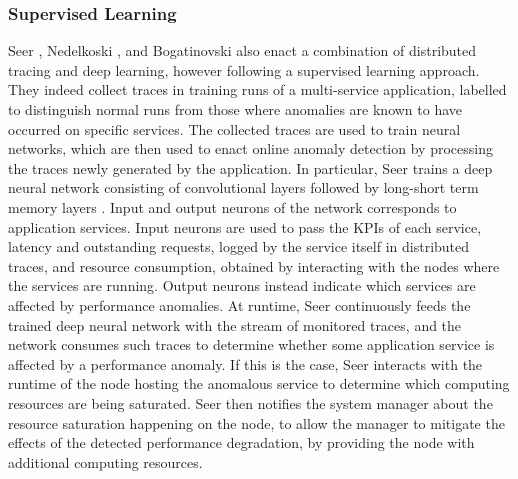 \subsubsection{Supervised Learning}
Seer \cite{17_Gan2019_Seer}, Nedelkoski \etal \cite{34_Nedelkoski2019_AnomalyDetectionDistributedTracing}, and Bogatinovski \etal \cite{36_Bogatinovski2020_SelfSupervisedAnomalyDetection} also enact a combination of distributed tracing and deep learning, however following a supervised learning approach.
They indeed collect traces in training runs of a multi-service application, labelled to distinguish normal runs from those where anomalies are known to have occurred on specific services.
The collected traces are used to train neural networks, which are then used to enact online anomaly detection by processing the traces newly generated by the application.
In particular, Seer \cite{17_Gan2019_Seer} trains a deep neural network consisting of convolutional layers followed by long-short term memory layers \cite{Goodfellow2016_DeepLearningBook}. 
Input and output neurons of the network corresponds to application services.
Input neurons are used to pass the KPIs of each service, \viz latency and outstanding requests, logged by the service itself in distributed traces, and resource consumption, obtained by interacting with the nodes where the services are running. 
Output neurons instead indicate which services are affected by performance anomalies.
At runtime, Seer \cite{17_Gan2019_Seer} continuously feeds the trained deep neural network with the stream of monitored traces, and the network consumes such traces to determine whether some application service is affected by a performance anomaly. 
If this is the case, Seer \cite{17_Gan2019_Seer} interacts with the runtime of the node hosting the anomalous service to determine which computing resources are being saturated.
Seer \cite{17_Gan2019_Seer} then notifies the system manager about the resource saturation happening on the node, to allow the manager to mitigate the effects of the detected performance degradation, \eg by providing the node with additional computing resources.

